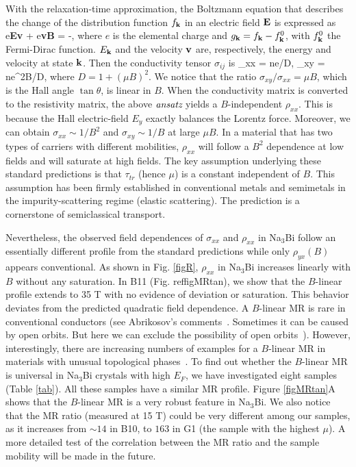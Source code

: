 With the relaxation-time approximation, the Boltzmann equation that describes the change of the distribution function $f_{\bf k}$ in an electric 
field $\bf E$ is expressed as~\cite{Ziman}
\be
e{\bf E\cdot v}  
+ e{\bf v\times B\cdot}
= -,
\label{Boltz}
\ee
where $e$ is the elemental charge and $g_{\bf k} = f_{\bf k}-f^0_{\bf k}$, with $f^0_{\bf k}$ the Fermi-Dirac function. $E_{\bf k}$ and the velocity $\bf v$ are, respectively, the energy and velocity at state $\bf k$. Then the conductivity tensor $\sigma_{ij}$ is
\be
\sigma_{xx} = ne\mu/D, \quad\quad \sigma_{xy} = ne\mu^2B/D,
\label{sxx}
\ee
where $D = 1+(\mu B)^2$. We notice that the ratio $\sigma_{xy}/\sigma_{xx}= \mu B$, which is the Hall angle $\tan\theta$, is linear in $B$. When the conductivity matrix is converted to the resistivity matrix, the above $\emph{ansatz}$ yields a $B$-independent $\rho_{xx}$. This is because the Hall electric-field $E_y$ exactly balances the Lorentz force. Moreover, we can obtain $\sigma_{xx}\sim 1/B^2$ and $\sigma_{xy}\sim 1/B$ at large $\mu B$. In a material that has two types of carriers with different mobilities, $\rho_{xx}$ will follow a $B^2$ dependence at low fields and will saturate at high fields. The key assumption underlying these standard predictions is that $\tau_{tr}$ (hence $\mu$) is a constant independent of $B$. This assumption has been firmly established in conventional metals and semimetals in the impurity-scattering regime (elastic scattering). The prediction is a cornerstone of semiclassical transport.


Nevertheless, the observed field dependences of $\sigma_{xx}$ and $\rho_{xx}$ in Na$_3$Bi follow an essentially different profile from the standard predictions while only $\rho_{yx}(B)$ appears conventional. As shown in Fig. \ref{figR}, $\rho_{xx}$ in Na$_3$Bi increases linearly with $B$ without any saturation. In B11 (Fig. ref{figMRtan}), we show that the $B$-linear profile extends to 35 T with no evidence of deviation or saturation. This behavior deviates from the predicted quadratic field dependence. A $B$-linear MR is rare in conventional conductors (see Abrikosov's comments~\cite{Abrikosov1998}. Sometimes it can be caused by open orbits. But here we can exclude the possibility of open orbits~\cite{Ziman}). However, interestingly, there are increasing numbers of examples for a $B$-linear MR in materials with unusual topological phases~\cite{Qu,Liang2015}. To find out whether the $B$-linear MR is universal in Na$_3$Bi crystals with high $E_F$, we have investigated eight samples (Table \ref{tab}). All these samples have a similar MR profile. Figure \ref{figMRtan}A shows that the $B$-linear MR is a very robust feature in Na$_3$Bi. We also notice that the MR ratio (measured at 15 T) could be very different among our samples, as it increases from $\sim 14$ in B10, to $163$ in G1 (the sample with the highest $\mu$). A more detailed test of the correlation between the MR ratio and the sample mobility will be made in the future. 



